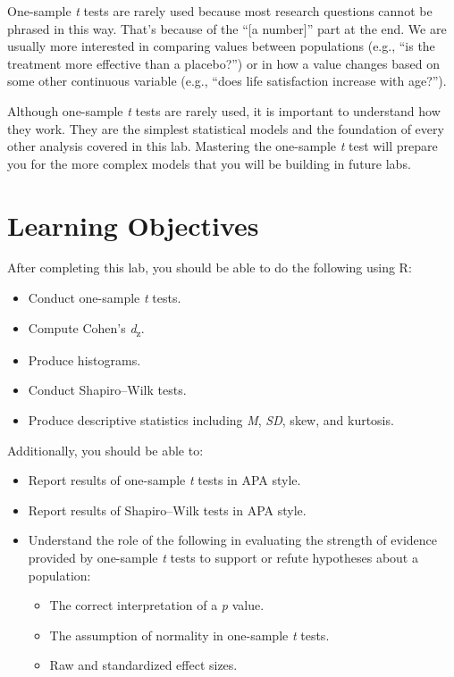 \documentclass[
]{book}
\providecommand{\tightlist}{%
  \setlength{\itemsep}{0pt}\setlength{\parskip}{0pt}}
\begin{document}
One-sample \emph{t} tests are rarely used because most research questions cannot be phrased in this way. That's because of the ``{[}a number{]}'' part at the end. We are usually more interested in comparing values between populations (e.g., ``is the treatment more effective than a placebo?'') or in how a value changes based on some other continuous variable (e.g., ``does life satisfaction increase with age?'').

Although one-sample \emph{t} tests are rarely used, it is important to understand how they work. They are the simplest statistical models and the foundation of every other analysis covered in this lab. Mastering the one-sample \emph{t} test will prepare you for the more complex models that you will be building in future labs.

\hypertarget{ost-objectives}{%
\section{Learning Objectives}\label{ost-objectives}}

After completing this lab, you should be able to do the following using R:

\begin{itemize}
\tightlist
\item
  Conduct one-sample \emph{t} tests.
\item
  Compute Cohen's \emph{d}\textsubscript{z}.
\item
  Produce histograms.
\item
  Conduct Shapiro--Wilk tests.
\item
  Produce descriptive statistics including \emph{M}, \emph{SD}, skew, and kurtosis.
\end{itemize}

Additionally, you should be able to:

\begin{itemize}
\tightlist
\item
  Report results of one-sample \emph{t} tests in APA style.
\item
  Report results of Shapiro--Wilk tests in APA style.
\item
  Understand the role of the following in evaluating the strength of evidence provided by one-sample \emph{t} tests to support or refute hypotheses about a population:

  \begin{itemize}
  \tightlist
  \item
    The correct interpretation of a \emph{p} value.
  \item
    The assumption of normality in one-sample \emph{t} tests.
  \item
    Raw and standardized effect sizes.
  \end{itemize}
\end{itemize}
\end{document}
